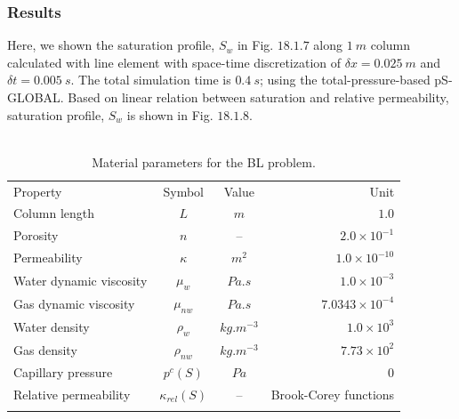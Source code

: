 \subsubsection*{\upshape\textbf{Results}}
\hspace*{0.25cm} Here, we shown the saturation profile, $S_w$ in Fig. $18.1.7$ along $1~m$ column calculated with line element with space-time discretization of $\delta x = 0.025~m$ and $\delta t = 0.005~s$. The total simulation time is $0.4~s$; using the total-pressure-based pS-GLOBAL. Based on linear relation between saturation and relative permeability, saturation profile, $S_w$ is shown in Fig. $18.1.8$.\\\\
\begin{table}[!htb]
\begin{tabular}{lccr}
\hline\hline\noalign{\smallskip}
Property & Symbol & Value & Unit \\
\noalign{\smallskip}\hline\noalign{\smallskip}
Column length & $L$ & $m$ & $1.0$  \\
Porosity & $n$ & -- & $2.0\times10^{-1}$ \\
Permeability & $\kappa$ & $ m^2$ & $1.0\times 10^{-10}$ \\
Water dynamic viscosity &  $\mu_w$ & $Pa.s$ & $1.0\times10^{-3}$ \\
Gas dynamic viscosity & $\mu_{nw}$ & $Pa.s$ & $7.0343\times10^{-4}$ \\
Water density &  $\rho_w$ &$kg.m^{-3}$ & $1.0\times10^{3}$ \\
Gas density &  $\rho_{nw}$ & $kg.m^{-3}$ & $7.73\times10^{2}$ \\
Capillary pressure & $p^c(S)$ & $Pa$ & 0 \\
Relative permeability & $\kappa_{rel}(S)$ & -- & Brook-Corey functions \\
\noalign{\smallskip}\hline\hline
\end{tabular}
\caption{Material parameters for the BL problem.}
\end{table}
